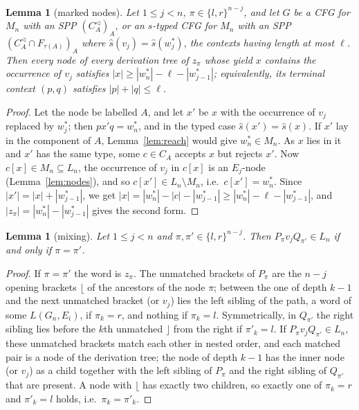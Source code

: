 \documentclass[11pt]{article}
\numberwithin{equation}{section}
\theoremstyle{plain}
\newtheorem{lemma}[theorem]{Lemma}
\theoremstyle{definition}
\theoremstyle{remark}
\theoremstyle{plain}
\newcommand{\Lc}{^{\lhd}}
\newcommand{\Lfl}{\lfloor}
\newcommand{\Rfl}{\rfloor}
\begin{document}
\begin{lemma}[marked nodes]\label{lem:marked-node}
Let $1\le j<n$, $\pi\in\{l,r\}^{n-j}$, and let $G$ be a CFG for $M_n$ with an
SPP $(C_A\Lc)_A$, or an $s$-typed CFG for $M_n$ with an SPP
$(C_A\Lc\cap F_{\tau(A)})_A$ where $\widehat s(v_j)=\widehat s(w^*_j)$, the
contexts having length at most $\ell$.  Then every node of every derivation
tree of $z_\pi$ whose yield $x$ contains the occurrence of $v_j$ satisfies
$|x|\ge|w^*_n|-\ell-|w^*_{j-1}|$; equivalently, its terminal context $(p,q)$
satisfies $|p|+|q|\le\ell$.
\end{lemma}
\begin{proof}
Let the node be labelled $A$, and let $x'$ be $x$ with the occurrence of
$v_j$ replaced by $w^*_j$; then $px'q=w^*_n$, and in the typed case
$\widehat s(x')=\widehat s(x)$.  If $x'$ lay in the component of $A$,
Lemma~\ref{lem:reach} would give $w^*_n\in M_n$.  As $x$ lies in it and $x'$
has the same type, some $c\in C_A$ accepts $x$ but rejects $x'$.  Now
$c[x]\in M_n\subseteq L_n$, the occurrence of $v_j$ in $c[x]$ is an
$E_j$-node (Lemma~\ref{lem:nodes}), and so $c[x']\in L_n\setminus M_n$, i.e.\
$c[x']=w^*_n$.  Since $|x'|=|x|+|w^*_{j-1}|$, we get
$|x|=|w^*_n|-|c|-|w^*_{j-1}|\ge|w^*_n|-\ell-|w^*_{j-1}|$, and
$|z_\pi|=|w^*_n|-|w^*_{j-1}|$ gives the second form.
\end{proof}

\begin{lemma}[mixing]\label{lem:mixing}
Let $1\le j<n$ and $\pi,\pi'\in\{l,r\}^{n-j}$.  Then
$P_\pi v_jQ_{\pi'}\in L_n$ if and only if $\pi=\pi'$.
\end{lemma}
\begin{proof}
If $\pi=\pi'$ the word is $z_\pi$.  The unmatched brackets of $P_\pi$ are the
$n-j$ opening brackets $\Lfl$ of the ancestors of the node $\pi$; between the
one of depth $k-1$ and the next unmatched bracket (or $v_j$) lies the left
sibling of the path, a word of some $L(G_n,E_i)$, if $\pi_k=r$, and nothing
if $\pi_k=l$.  Symmetrically, in $Q_{\pi'}$ the right sibling lies before
the $k$th unmatched $\Rfl$ from the right if $\pi'_k=l$.  If
$P_\pi v_jQ_{\pi'}\in L_n$, these unmatched brackets match each other in
nested order, and each matched pair is a node of the derivation tree; the
node of depth $k-1$ has the inner node (or $v_j$) as a child together with
the left sibling of $P_\pi$ and the right sibling of $Q_{\pi'}$ that are
present.  A node with $\Lfl$ has exactly two children, so exactly one of
$\pi_k=r$ and $\pi'_k=l$ holds, i.e.\ $\pi_k=\pi'_k$.
\end{proof}
\end{document}
